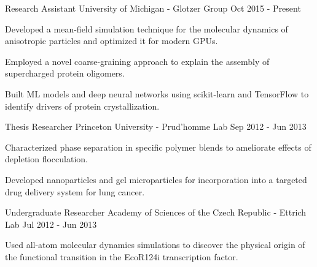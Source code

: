\newcommand{\ecoli}{\emph{E. coli }}
\newcommand{\ejub}{\emph{E. jubatus }}
\newcommand{\gal}{\emph{G. g. domesticus}}
\begin{cventries}
  \cventry
    {Research Assistant} %
    {University of Michigan - Glotzer Group} %
    {} %
    {Oct 2015 - Present} %
    {
      \begin{cvitems} %
        \item Developed a mean-field simulation technique for the molecular dynamics of anisotropic particles and optimized it for modern GPUs.
        \item Employed a novel coarse-graining approach to explain the assembly of supercharged protein oligomers.
        \item Built ML models and deep neural networks using scikit-learn and TensorFlow to identify drivers of protein crystallization.
      \end{cvitems}
    }
  \cventry
    {Thesis Researcher} %
    {Princeton University - Prud'homme Lab} %
    {} %
    {Sep 2012 - Jun 2013} %
    {
      \begin{cvitems} %
        \item Characterized phase separation in specific polymer blends to ameliorate effects of depletion flocculation.
	    \item Developed nanoparticles and gel microparticles for incorporation into a targeted drug delivery system for lung cancer.
      \end{cvitems}
    }
  \cventry
    {Undergraduate Researcher} %
    {Academy of Sciences of the Czech Republic - Ettrich Lab} %
    {} %
    {Jul 2012 - Jun 2013} %
    {
      \begin{cvitems} %
        \item Used all-atom molecular dynamics simulations to discover the physical origin of the functional transition in the EcoR124i transcription factor.

\end{cvitems}}
\end{cventries}
